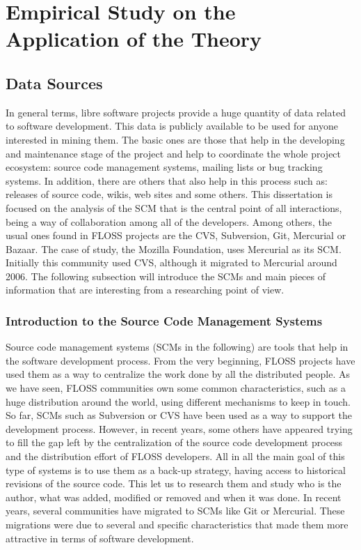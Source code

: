 \documentclass[a4paper, 12pt]{book}
\begin{document}
\cleardoublepage
\chapter{Empirical Study on the Application of the Theory}
\label{chap:application}

\section{Data Sources}
\label{sec:sources}

In general terms, libre software projects provide a huge quantity of data related to software development. This data is publicly available to be used for anyone interested in mining them. The basic ones are those that help in the developing and maintenance stage of the project and help to coordinate the whole project ecosystem: source code management systems, mailing lists or bug tracking systems. In addition, there are others that also help in this process such as: releases of source code, wikis, web sites and some others.
This dissertation is focused on the analysis of the SCM that is the central point of all interactions, being a way of collaboration among all of the developers. Among others, the usual ones found in FLOSS projects are the CVS, Subversion, Git, Mercurial or Bazaar. The case of study, the Mozilla Foundation, uses Mercurial as its SCM. Initially this community used CVS, although it migrated to Mercurial around 2006. The following subsection will introduce the SCMs and main pieces of information that are interesting from a researching point of view.


\subsection{Introduction to the Source Code Management Systems}
Source code management systems (SCMs in the following) are tools that help in the software development process. From the very beginning, FLOSS projects have used them as a way to centralize the work done by all the distributed people. As we have seen, FLOSS communities own some common characteristics, such as a huge distribution around the world, using different mechanisms to keep in touch.
So far, SCMs such as Subversion or CVS have been used as a way to support the development process. However, in recent years, some others have appeared trying to fill the gap left by the centralization of the source code development process and the distribution effort of FLOSS developers. All in all the main goal of this type of systems is to use them as a back-up strategy, having access to historical revisions of the source code. This let us to research them and study who is the author, what was added, modified or removed and when it was done.
In recent years, several communities have migrated to SCMs like Git or Mercurial. These migrations were due to several and specific characteristics that made them more attractive in terms of software development.
\end{document}
